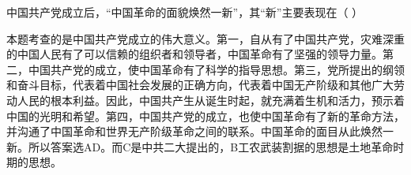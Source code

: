 \question 中国共产党成立后，``中国革命的面貌焕然一新''，其``新''主要表现在（ ）
\par{}
\begin{solution}本题考查的是中国共产党成立的伟大意义。第一，自从有了中国共产党，灾难深重的中国人民有了可以信赖的组织者和领导者，中国革命有了坚强的领导力量。第二，中国共产党的成立，使中国革命有了科学的指导思想。第三，党所提出的纲领和奋斗目标，代表着中国社会发展的正确方向，代表着中国无产阶级和其他广大劳动人民的根本利益。因此，中国共产生从诞生时起，就充满着生机和活力，预示着中国的光明和希望。第四，中国共产党的成立，也使中国革命有了新的革命方法，并沟通了中国革命和世界无产阶级革命之间的联系。中国革命的面目从此焕然一新。所以答案选AD。而C是中共二大提出的，B工农武装割据的思想是土地革命时期的思想。
\end{solution}
